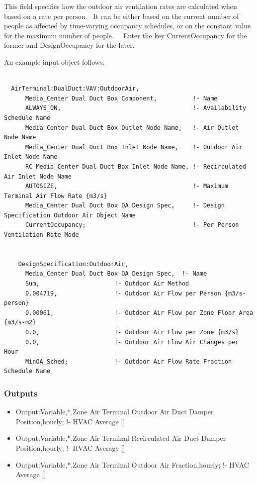 This field specifies how the outdoor air ventilation rates are calculated when based on a rate per person.~ It can be either based on the current number of people as affected by time-varying occupancy schedules, or on the constant value for the maximum number of people.~~ Enter the key CurrentOccupancy for the former and DesignOccupancy for the later.

An example input object follows.

\begin{lstlisting}

  AirTerminal:DualDuct:VAV:OutdoorAir,
      Media_Center Dual Duct Box Component,          !- Name
      ALWAYS_ON,                                     !- Availability Schedule Name
      Media_Center Dual Duct Box Outlet Node Name,   !- Air Outlet Node Name
      Media_Center Dual Duct Box Inlet Node Name,    !- Outdoor Air Inlet Node Name
      RC Media_Center Dual Duct Box Inlet Node Name, !- Recirculated Air Inlet Node Name
      AUTOSIZE,                                      !- Maximum Terminal Air Flow Rate {m3/s}
      Media_Center Dual Duct Box OA Design Spec,     !- Design Specification Outdoor Air Object Name
      CurrentOccupancy;                              !- Per Person Ventilation Rate Mode


    DesignSpecification:OutdoorAir,
      Media_Center Dual Duct Box OA Design Spec,  !- Name
      Sum,                     !- Outdoor Air Method
      0.004719,                !- Outdoor Air Flow per Person {m3/s-person}
      0.00061,                 !- Outdoor Air Flow per Zone Floor Area {m3/s-m2}
      0.0,                     !- Outdoor Air Flow per Zone {m3/s}
      0.0,                     !- Outdoor Air Flow Air Changes per Hour
      MinOA_Sched;             !- Outdoor Air Flow Rate Fraction Schedule Name
\end{lstlisting}

\subsubsection{Outputs}\label{outputs-14}

\begin{itemize}
\item
  Output:Variable,*,Zone Air Terminal Outdoor Air Duct Damper Position,hourly; !- HVAC Average {[]}
\item
  Output:Variable,*,Zone Air Terminal Recirculated Air Duct Damper Position,hourly; !- HVAC Average {[]}
\item
  Output:Variable,*,Zone Air Terminal Outdoor Air Fraction,hourly; !- HVAC Average {[]}
\end{itemize}

